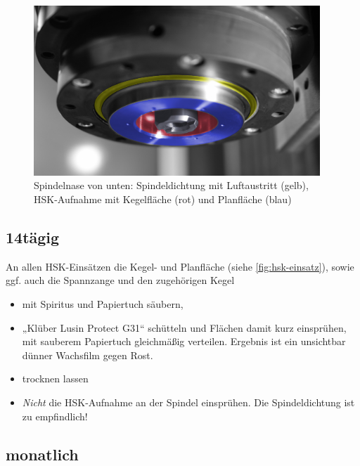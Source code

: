 \documentclass{\basedir/fablab-document}
\begin{document}
\begin{figure}[hb]
\centering
\includegraphics[height=6.4cm]{./img/hsk-aufnahme.jpg}
\caption{Spindelnase von unten: Spindeldichtung mit Luftaustritt (gelb), \\HSK-Aufnahme mit Kegelfläche (rot) und Planfläche (blau)}
\label{fig:hsk-aufnahme}
\end{figure}

\subsection{14tägig}
An allen HSK-Einsätzen die Kegel- und Planfläche (siehe \cref{fig:hsk-einsatz}), sowie ggf. auch die Spannzange und den zugehörigen Kegel
\begin{itemize}
	\item mit Spiritus und Papiertuch säubern, 
	\item „Klüber Lusin Protect G31“ schütteln und Flächen damit kurz einsprühen, mit sauberem Papiertuch gleichmäßig verteilen. Ergebnis ist ein unsichtbar dünner Wachsfilm gegen Rost.
	\item trocknen lassen
	\item \emph{Nicht} die HSK-Aufnahme an der Spindel einsprühen. Die Spindeldichtung ist zu empfindlich!
\end{itemize}

\subsection{monatlich}
\end{document}
